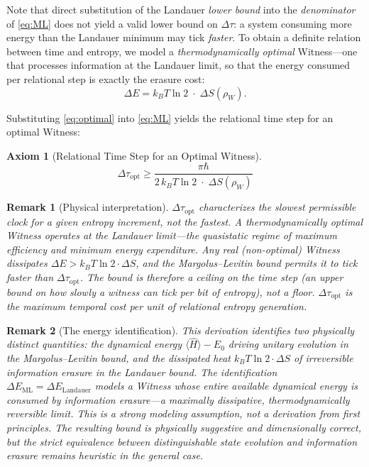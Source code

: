 \documentclass[12pt, a4paper]{article}
\newtheorem{axiom}{Axiom}
\newtheorem{remark}{Remark}
\begin{document}
Note that direct substitution of the Landauer \emph{lower bound} into the \emph{denominator} of \eqref{eq:ML} does not yield a valid lower bound on $\Delta\tau$: a system consuming more energy than the Landauer minimum may tick \emph{faster}. To obtain a definite relation between time and entropy, we model a \emph{thermodynamically optimal} Witness---one that processes information at the Landauer limit, so that the energy consumed per relational step is exactly the erasure cost:
\begin{equation}
\Delta E = k_B T \ln 2 \;\cdot\; \Delta S(\rho_W).
\label{eq:optimal}
\end{equation}

Substituting \eqref{eq:optimal} into \eqref{eq:ML} yields the relational time step for an optimal Witness:

\begin{axiom}[Relational Time Step for an Optimal Witness]
\begin{equation}
\boxed{\;\Delta \tau_{\mathrm{opt}} \geq \frac{\pi \hbar}{2\, k_B T \ln 2 \;\cdot\; \Delta S(\rho_W)}\;}
\label{eq:taumin}
\end{equation}
\end{axiom}

\begin{remark}[Physical interpretation]
\label{rem:ceiling}
$\Delta\tau_{\mathrm{opt}}$ characterizes the \emph{slowest} permissible clock for a given entropy increment, not the fastest. A thermodynamically optimal Witness operates at the Landauer limit---the quasistatic regime of maximum efficiency and minimum energy expenditure. Any real (non-optimal) Witness dissipates $\Delta E > k_B T \ln 2 \cdot \Delta S$, and the Margolus--Levitin bound permits it to tick \emph{faster} than $\Delta\tau_{\mathrm{opt}}$. The bound is therefore a \emph{ceiling} on the time step (an upper bound on how slowly a witness can tick per bit of entropy), not a floor. $\Delta\tau_{\mathrm{opt}}$ is the maximum temporal cost per unit of relational entropy generation.
\end{remark}

\begin{remark}[The energy identification]
\label{rem:energy}
This derivation identifies two physically distinct quantities: the \emph{dynamical energy} $\langle \hat{H} \rangle - E_0$ driving unitary evolution in the Margolus--Levitin bound, and the \emph{dissipated heat} $k_B T \ln 2 \cdot \Delta S$ of irreversible information erasure in the Landauer bound. The identification $\Delta E_{\mathrm{ML}} = \Delta E_{\mathrm{Landauer}}$ models a Witness whose entire available dynamical energy is consumed by information erasure---a maximally dissipative, thermodynamically reversible limit. This is a strong modeling assumption, not a derivation from first principles. The resulting bound is physically suggestive and dimensionally correct, but the strict equivalence between distinguishable state evolution and information erasure remains heuristic in the general case.
\end{remark}
\end{document}
